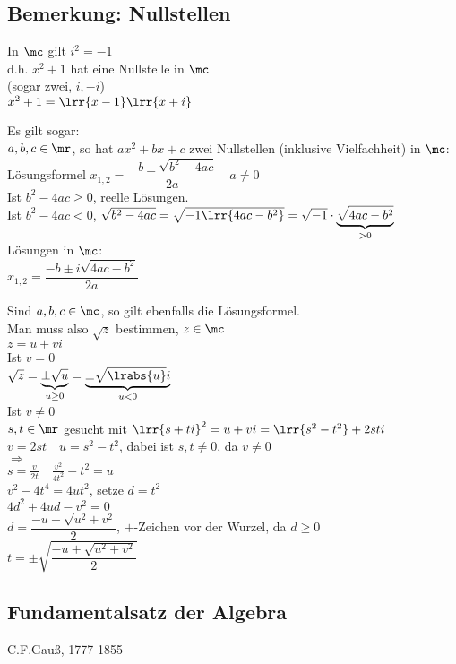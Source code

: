 \subsection{Bemerkung: Nullstellen}
		\item In $\mc$ gilt $i^2=-1$\\
			d.h. $x^2+1$ hat eine Nullstelle in $\mc$\\
			(sogar zwei, $i,-i$)\\
			$x^2+1=\lrr{x-1}\lrr{x+i}$

			Es gilt sogar:\\
			$a,b,c\in\mr$, so hat $ax^2+bx+c$ zwei Nullstellen (inklusive Vielfachheit) in $\mc$:\\
			Lösungsformel $x_{1,2}=\dfrac{-b\pm\sqrt{b^2-4ac}}{2a}\quad a\neq 0$\\
			Ist $b^2-4ac\geq 0$, reelle Lösungen.\\
			Ist $b^2-4ac <0$, $\sqrt{b^2-4ac}=\sqrt{-1\lrr{4ac-b^2}}=\sqrt{-1}\cdot \underbrace{\sqrt{4ac-b^2}}_{>0}$\\
			Lösungen in $\mc$:\\
			$x_{1,2} =\dfrac{-b\pm i\sqrt{4ac-b^2}}{2a}$
		\item Sind $a,b,c \in \mc$, so gilt ebenfalls die Lösungsformel.\\
			Man muss also $\sqrt{z}$ bestimmen, $z\in\mc$\\
			$z=u+vi$\\
			Ist $v=0$\\
			$\sqrt{z}=\underbrace{\pm\sqrt{u}}_{u\geq 0}=\underbrace{\pm\sqrt{\lrabs{u}}i}_{u<0}$\\
			Ist $v\neq 0$\\
			$s,t\in\mr$ gesucht mit $\lrr{s+ti}^2=u+vi=\lrr{s^2-t^2}+2sti$\\
			$v=2st\quad u=s^2-t^2$, dabei ist $s,t\neq 0$, da $v\neq 0$\\
			$\Rightarrow$\\
			$s=\frac{v}{2t}\quad\frac{v^2}{4t^2}-t^2=u$\\
			$v^2-4t^4=4ut^2$, setze $d=t^2$\\
			$4d^2+4ud-v^2=0$\\
			$d=\dfrac{-u+\sqrt{u^2+v^2}}{2}$, $+$-Zeichen vor der Wurzel, da $d\geq 0$\\
			$t=\pm\sqrt{\dfrac{-u+\sqrt{u^2+v^2}}{2}}$
	\subExEnd

\subsection{Fundamentalsatz der Algebra}
	C.F.Gauß, 1777-1855

